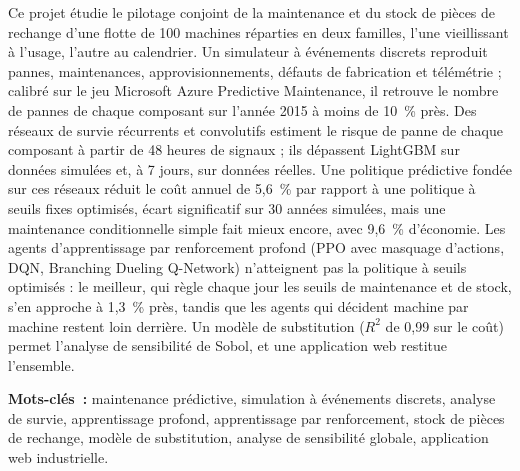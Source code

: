 Ce projet étudie le pilotage conjoint de la maintenance et du stock de pièces de rechange d'une flotte de 100 machines réparties en deux familles, l'une vieillissant à l'usage, l'autre au calendrier. Un simulateur à événements discrets reproduit pannes, maintenances, approvisionnements, défauts de fabrication et télémétrie ; calibré sur le jeu Microsoft Azure Predictive Maintenance, il retrouve le nombre de pannes de chaque composant sur l'année 2015 à moins de 10~\% près. Des réseaux de survie récurrents et convolutifs estiment le risque de panne de chaque composant à partir de 48 heures de signaux ; ils dépassent LightGBM sur données simulées et, à 7 jours, sur données réelles. Une politique prédictive fondée sur ces réseaux réduit le coût annuel de 5,6~\% par rapport à une politique à seuils fixes optimisés, écart significatif sur 30 années simulées, mais une maintenance conditionnelle simple fait mieux encore, avec 9,6~\% d'économie. Les agents d'apprentissage par renforcement profond (PPO avec masquage d'actions, DQN, Branching Dueling Q-Network) n'atteignent pas la politique à seuils optimisés : le meilleur, qui règle chaque jour les seuils de maintenance et de stock, s'en approche à 1,3~\% près, tandis que les agents qui décident machine par machine restent loin derrière. Un modèle de substitution ($R^2$ de 0,99 sur le coût) permet l'analyse de sensibilité de Sobol, et une application web restitue l'ensemble.

\vspace{0.8em}
\noindent\textbf{Mots-clés~:} maintenance prédictive, simulation à événements discrets, analyse de survie, apprentissage profond, apprentissage par renforcement, stock de pièces de rechange, modèle de substitution, analyse de sensibilité globale, application web industrielle.
